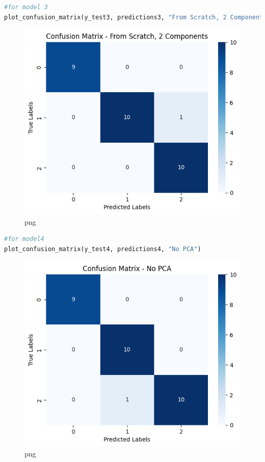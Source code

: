 \documentclass[
]{article}
\begin{document}
\begin{lstlisting}[language=Python]
#for model 3
plot_confusion_matrix(y_test3, predictions3, "From Scratch, 2 Components")
\end{lstlisting}

\begin{figure}
\centering
\includegraphics{PCA on IRIS_files/PCA on IRIS_69_0.png}
\caption{png}
\end{figure}

\begin{lstlisting}[language=Python]
#for model4
plot_confusion_matrix(y_test4, predictions4, "No PCA")
\end{lstlisting}

\begin{figure}
\centering
\includegraphics{PCA on IRIS_files/PCA on IRIS_70_0.png}
\caption{png}
\end{figure}
\end{document}
